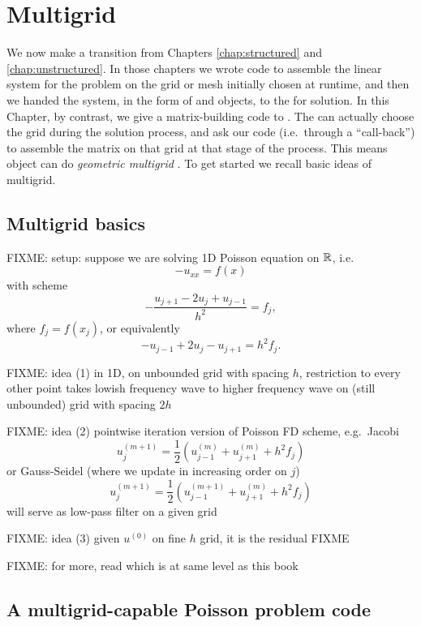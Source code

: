 
\chapter{Multigrid}
\label{chap:multigrid}

We now make a transition from Chapters \ref{chap:structured} and \ref{chap:unstructured}.  In those chapters we wrote code to assemble the linear system for the problem on the grid or mesh initially chosen at runtime, and then we handed the system, in the form of \pMat and \pVec objects, to the \pKSP for solution.  In this Chapter, by contrast, we give a matrix-building code to \pKSP.  The \pKSP can actually choose the grid during the solution process, and ask our code (i.e.~through a ``call-back'') to assemble the matrix on that grid at that stage of the process.  This means \PETSc \pKSP object can do \emph{geometric multigrid} \citep{Briggsetal2000}.  To get started we recall basic ideas of multigrid.


\section{Multigrid basics}

FIXME: setup: suppose we are solving 1D Poisson equation on $\mathbb{R}$, i.e.
    $$- u_{xx} = f(x)$$
with scheme
    $$- \frac{u_{j+1} - 2 u_j + u_{j-1}}{h^2} = f_j,$$
where $f_j = f(x_j)$, or equivalently
    $$- u_{j-1} + 2 u_j - u_{j+1} = h^2 f_j.$$

FIXME: idea (1) in 1D, on unbounded grid with spacing $h$, restriction to every other point takes lowish frequency wave to higher frequency wave on (still unbounded) grid with spacing $2h$

FIXME: idea (2) pointwise iteration version of Poisson FD scheme, e.g.~Jacobi
   $$u_j^{(m+1)} = \frac{1}{2} \left(u_{j-1}^{(m)} + u_{j+1}^{(m)} + h^2 f_j\right) $$
or Gauss-Seidel (where we update in increasing order on $j$)
   $$u_j^{(m+1)} = \frac{1}{2} \left(u_{j-1}^{(m+1)} + u_{j+1}^{(m)} + h^2 f_j\right) $$
will serve as low-pass filter on a given grid

FIXME: idea (3) given $u^{(0)}$ on fine $h$ grid, it is the residual FIXME

FIXME: for more, read \citep{Briggsetal2000} which is at same level as this book


\section{A multigrid-capable Poisson problem code}

